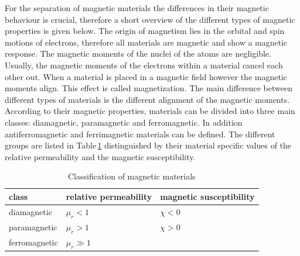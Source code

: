 For the separation of magnetic materials the differences in their magnetic behaviour is crucial, therefore a short overview of the different types of magnetic properties is given below. The origin of magnetism lies in the orbital and spin motions of electrons, therefore all materials are magnetic and show a magnetic response. The magnetic moments of the nuclei of the atoms are negligible. Usually,  the magnetic moments of the electrons within a material cancel each other out. When a material is placed in a magnetic field however the magnetic moments align. This effect is called magnetization. The main difference between different types of materials is the different alignment of the magnetic moments. According to their magnetic properties, materials can be divided into three main classes: diamagnetic, paramagnetic and ferromagnetic. In addition antiferromagnetic and ferrimagnetic materials can be defined. The different groups are listed in Table\,\ref{table:mag_material} distinguished by their material specific values of the relative permeability and the magnetic susceptibility. 

\begin{table}[H]
\centering
\caption{Classification of magnetic materials}
\label{table:mag_material}
\begin{tabular}{lll}\hline
class & relative permeability & magnetic susceptibility \\
\hline\hline
diamagnetic & $\mu_{r}<1$ & $\chi<0$ \\
paramagnetic & $\mu_{r}>1$ & $\chi>0$ \\
ferromagnetic & $\mu_{r}\gg1$ &  \\
\hline
\end{tabular}
\end{table}

